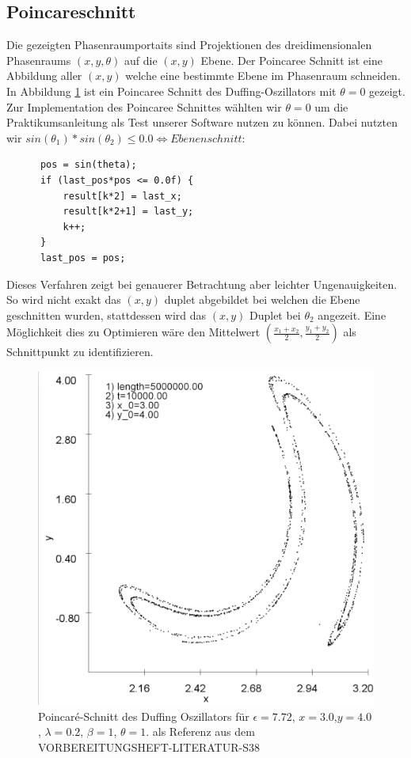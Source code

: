 \documentclass{scrartcl}
\begin{document}
\subsection{ Poincareschnitt }
Die gezeigten Phasenraumportaits sind Projektionen des dreidimensionalen Phasenraums $(x,y,\theta)$ auf die $(x,y)$ Ebene. Der Poincaree Schnitt ist eine Abbildung aller $(x,y)$ welche eine bestimmte Ebene im Phasenraum schneiden. In Abbildung \ref{img:poincare-772} ist ein Poincaree Schnitt des Duffing-Oszillators mit $\theta=0$ gezeigt. Zur Implementation des Poincaree Schnittes wählten wir $\theta=0$ um die Praktikumsanleitung als Test unserer Software nutzen zu können. Dabei nutzten wir $sin(\theta_1)*sin(\theta_2) \leq 0.0 \iff Ebenenschnitt$:
\begin{lstlisting}
      pos = sin(theta);
      if (last_pos*pos <= 0.0f) {
          result[k*2] = last_x;
          result[k*2+1] = last_y;
          k++;
      }
      last_pos = pos;
\end{lstlisting}
Dieses Verfahren zeigt bei genauerer Betrachtung aber leichter Ungenauigkeiten. So wird nicht exakt das $(x,y)$ duplet abgebildet bei welchen die Ebene geschnitten wurden, stattdessen wird das $(x,y)$ Duplet bei $\theta_2$ angezeit. Eine Möglichkeit dies zu Optimieren wäre den Mittelwert $(\frac{x_1+x_2}{2}, \frac{y_1 + y_2}{2})$ als Schnittpunkt zu identifizieren.
\begin{figure}
	\centering
	\includegraphics[scale=0.20]{poincare-772}
	\caption{Poincaré-Schnitt des Duffing Oszillators für $\epsilon=7.72$, $x=3.0$,$ y=4.0$, $\lambda=0.2$, $\beta=1$, $\theta=1$. als Referenz aus dem VORBEREITUNGSHEFT-LITERATUR-S38}
	\label{img:poincare-772}
\end{figure}
\end{document}
